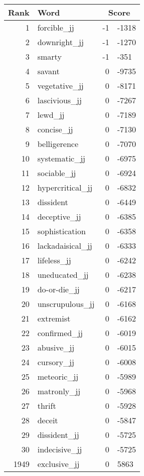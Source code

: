 \begin{longtable}[!htbp]{| rlr@{.}l |}
    \hline
    \textbf{Rank} & \textbf{Word} & \multicolumn{2}{c|}{\textbf{Score}} \\
    \hline
    \endhead
    1 & forcible\_jj & -1 & -1318 \\
    2 & downright\_jj & -1 & -1270 \\
    3 & smarty & -1 & -351 \\
    4 & savant & 0 & -9735 \\
    5 & vegetative\_jj & 0 & -8171 \\
    6 & lascivious\_jj & 0 & -7267 \\
    7 & lewd\_jj & 0 & -7189 \\
    8 & concise\_jj & 0 & -7130 \\
    9 & belligerence & 0 & -7070 \\
    10 & systematic\_jj & 0 & -6975 \\
    11 & sociable\_jj & 0 & -6924 \\
    12 & hypercritical\_jj & 0 & -6832 \\
    13 & dissident & 0 & -6449 \\
    14 & deceptive\_jj & 0 & -6385 \\
    15 & sophistication & 0 & -6358 \\
    16 & lackadaisical\_jj & 0 & -6333 \\
    17 & lifeless\_jj & 0 & -6242 \\
    18 & uneducated\_jj & 0 & -6238 \\
    19 & do-or-die\_jj & 0 & -6217 \\
    20 & unscrupulous\_jj & 0 & -6168 \\
    21 & extremist & 0 & -6162 \\
    22 & confirmed\_jj & 0 & -6019 \\
    23 & abusive\_jj & 0 & -6015 \\
    24 & cursory\_jj & 0 & -6008 \\
    25 & meteoric\_jj & 0 & -5989 \\
    26 & matronly\_jj & 0 & -5968 \\
    27 & thrift & 0 & -5928 \\
    28 & deceit & 0 & -5847 \\
    29 & dissident\_jj & 0 & -5725 \\
    30 & indecisive\_jj & 0 & -5725 \\
    1949 & exclusive\_jj & 0 & 5863 \\

\end{longtable}

